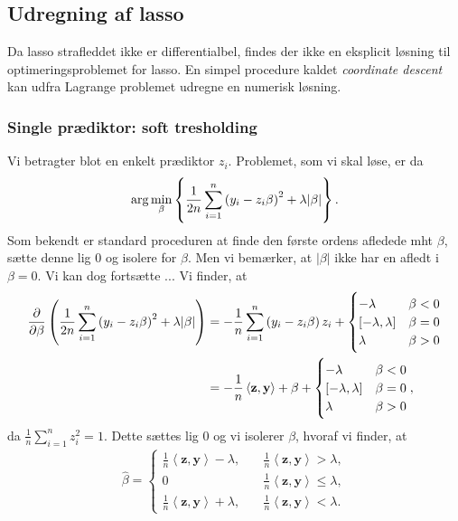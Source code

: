 \subsection{Udregning af lasso} \label{subsec:udregning_lasso}
Da lasso strafleddet ikke er differentialbel, findes der ikke en eksplicit løsning til optimeringsproblemet for lasso.
En simpel procedure kaldet \textit{coordinate descent} kan udfra Lagrange problemet udregne en numerisk løsning. 

\subsubsection{Single prædiktor: soft tresholding}
Vi betragter blot en enkelt prædiktor \(z_i\). 
Problemet, som vi skal løse, er da
\begin{align*}
\arg \min_{\beta} \cbr{\frac{1}{2n} \sum_{i=1}^n \del{y_i - z_{i} \beta}^2 + \lambda \vert \beta \vert}.
\end{align*}
Som bekendt er standard proceduren at finde den første ordens afledede mht $\beta$, sætte denne lig 0 og isolere for $\beta$. 
Men vi bemærker, at \(\vert \beta \vert \) ikke har en afledt i $\beta=0$.
Vi kan dog fortsætte ...
Vi finder, at
\begin{align*}
\frac{\partial}{\partial \beta} \del{\frac{1}{2n} \sum_{i=1}^n \del{y_i - z_{i} \beta}^2 + \lambda \vert \beta \vert}
&= -\frac{1}{n} \sum_{i=1}^n \del{y_i - z_{i} \beta} z_i + \begin{cases}
-\lambda \quad &\beta < 0 \\
[-\lambda, \lambda] & \beta = 0 \\
\lambda & \beta >0 
\end{cases}  \\
&= -\frac{1}{n} \left\langle \mathbf{z}, \mathbf{y} \right\rangle + \beta + \begin{cases}
-\lambda \quad &\beta < 0 \\
[-\lambda, \lambda] & \beta = 0 \\
\lambda & \beta >0 
\end{cases},
\end{align*}
da $\frac{1}{n} \sum_{i=1}^n z_i^2=1$. Dette sættes lig 0 og vi isolerer $\beta$, hvoraf vi finder, at
\begin{align}
\hat{\beta} = \begin{cases}
\frac{1}{n} \left\langle \mathbf{z}, \mathbf{y} \right\rangle - \lambda, \quad &\frac{1}{n} \left\langle \mathbf{z}, \mathbf{y} \right\rangle > \lambda, \\
0 &\frac{1}{n} \left\langle \mathbf{z}, \mathbf{y} \right\rangle \leq \lambda, \\
\frac{1}{n} \left\langle \mathbf{z}, \mathbf{y} \right\rangle + \lambda, &\frac{1}{n} \left\langle \mathbf{z}, \mathbf{y} \right\rangle < \lambda.
\end{cases} \label{eq:2.10}
\end{align}
